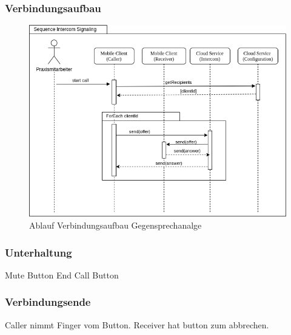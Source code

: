 \clearpage

\subsubsection*{Verbindungsaufbau}

\begin{figure}[h]
    \centering
    \begin{minipage}[b]{0.9\textwidth}
        \includegraphics[width=\textwidth]{graphics/diagramms/Sequence_Intercom_Broking_V02}
        \caption{Ablauf Verbindungsaufbau Gegensprechanalge}
    \end{minipage}
\end{figure}



\subsubsection*{Unterhaltung}

Mute Button
End Call Button


\subsubsection*{Verbindungsende}

Caller nimmt Finger vom Button.
Receiver hat button zum abbrechen.

\clearpage
